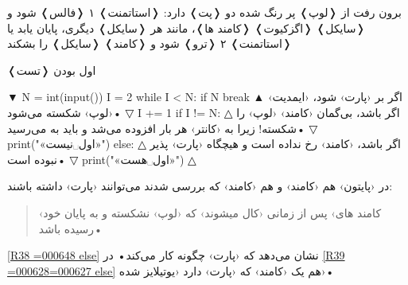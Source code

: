 \documentclass[openany, twocolumn]{book}
\begin{document}
\begin{Figure}

\caption{برون رفت از ❬لوپ❭ پر رنگ شده دو ❬پت❭ دارد: ❬استاتمنت❭ ۱ ❬فالس❭ شود و ❬سایکل❭ ❬اگزکیوت❭ ❬کامند ها❭، مانند هر ❬سایکل❭ دیگری، پایان یابد یا ❬استاتمنت❭ ۲ ❬ترو❭ شود و ❬کامند❭  ❬سایکل❭ را بشکند\label{R38}}
\end{Figure}

\begin{Program}
\caption{❬تست❭ اول بودن\label{R39}}

▼
N = int(input())
I = 2
while I < N:
	if N %
		break
▲
 اگر  بر  ‹پارت› شود، ‹ایمدیت› ‹لوپ› شکسته می‌شود• 
▽
	I += 1
if I != N:
△
 اگر  باشد، بی‌گمان ‹کامند›  ‹لوپ› را شکسته! زیرا به ‹کانتر›  هر بار افزوده می‌شد و باید به  می‌رسید• 
▽
	print("«اول␣نیست»")
else:
△
 اگر  باشد، ‹کامند›  رخ نداده است و  هیچگاه ‹پارت› پذیر نبوده است• 
▽
	print("«اول␣هست»")
△
\end{Program}

در ‹پایتون› هم ‹کامند›  و هم ‹کامند›  که بررسی شدند می‌توانند ‹پارت›  داشته باشند:
\begin{quotation}
‹کامند های› پس از  زمانی ‹کال میشوند› که ‹لوپ› نشکسته و به پایان خود رسیده باشد•
\end{quotation}
\ref{R38 =000648 else} نشان می‌دهد که ‹پارت›  چگونه کار می‌کند• در \ref{R39 =000628=000627 else} هم یک ‹کامند›  که ‹پارت›  دارد ‹یوتیلایز شده›•
\end{document}

